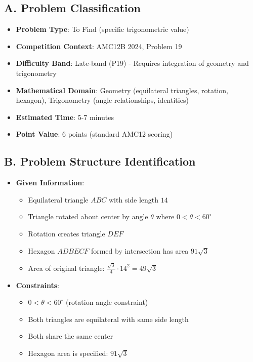 \documentclass[12pt]{article}
\begin{document}
\begin{problemconfigbox}
\subsection*{A. Problem Classification}
\begin{itemize}[leftmargin=*]
    \item \textbf{Problem Type}: To Find (specific trigonometric value)
    \item \textbf{Competition Context}: AMC12B 2024, Problem 19
    \item \textbf{Difficulty Band}: Late-band (P19) - Requires integration of geometry and trigonometry
    \item \textbf{Mathematical Domain}: Geometry (equilateral triangles, rotation, hexagon), Trigonometry (angle relationships, identities)
    \item \textbf{Estimated Time}: 5-7 minutes
    \item \textbf{Point Value}: 6 points (standard AMC12 scoring)
\end{itemize}

\subsection*{B. Problem Structure Identification}
\begin{itemize}[leftmargin=*]
    \item \textbf{Given Information}: 
    \begin{itemize}
        \item Equilateral triangle $ABC$ with side length $14$
        \item Triangle rotated about center by angle $\theta$ where $0 < \theta < 60^{\circ}$
        \item Rotation creates triangle $DEF$
        \item Hexagon $ADBECF$ formed by intersection has area $91\sqrt{3}$
        \item Area of original triangle: $\frac{\sqrt{3}}{4} \cdot 14^2 = 49\sqrt{3}$
    \end{itemize}
    
    \item \textbf{Constraints}: 
    \begin{itemize}
        \item $0 < \theta < 60^{\circ}$ (rotation angle constraint)
        \item Both triangles are equilateral with same side length
        \item Both share the same center
        \item Hexagon area is specified: $91\sqrt{3}$
    \end{itemize}
    

\end{itemize}
\end{problemconfigbox}
\end{document}
